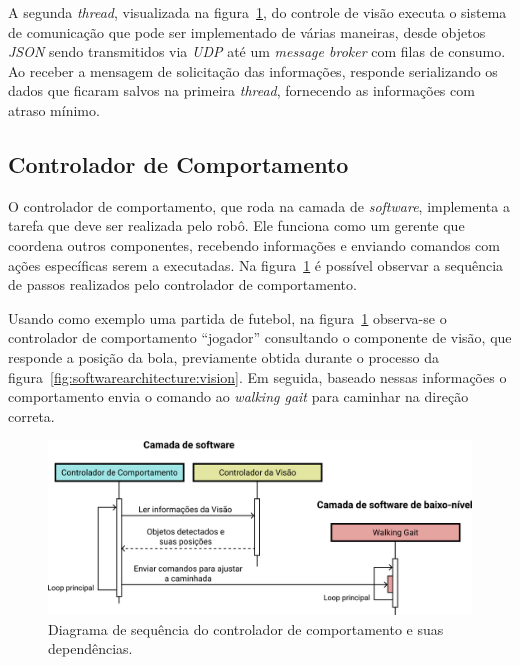 A segunda \textit{thread}, visualizada na figura~\ref{fig:softwarearchitecture:software}, do controle de visão executa o sistema de comunicação que pode ser implementado de várias maneiras, desde objetos \textit{JSON} sendo transmitidos via \textit{UDP} até um \textit{message broker} com filas de consumo. Ao receber a mensagem de solicitação das informações, responde serializando os dados que ficaram salvos na primeira \textit{thread}, fornecendo as informações com atraso mínimo.

\subsection{Controlador de Comportamento}

O controlador de comportamento, que roda na camada de \textit{software}, implementa a tarefa que deve ser realizada pelo robô. Ele funciona como um gerente que coordena outros componentes, recebendo informações e enviando comandos com ações específicas serem a executadas. Na figura~\ref{fig:softwarearchitecture:software} é possível observar a sequência de passos realizados pelo controlador de comportamento.

Usando como exemplo uma partida de futebol, na figura~\ref{fig:softwarearchitecture:software} observa-se o controlador de comportamento ``jogador'' consultando o componente de visão, que responde a posição da bola, previamente obtida durante o processo da figura~\ref{fig:softwarearchitecture:vision}. Em seguida, baseado nessas informações o comportamento envia o comando ao \textit{walking gait} para caminhar na direção correta.

\begin{figure}[htb]
	\centering
	\includegraphics[scale=1]{imagens/svg/softwarearchitecture-software}
	\caption{Diagrama de sequência do controlador de comportamento e suas dependências.}
	\label{fig:softwarearchitecture:software}
\end{figure}

